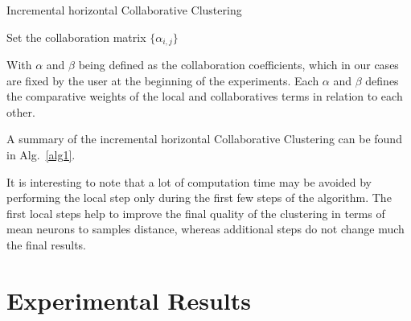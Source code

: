		\begin{algorithm}[H]
			\caption{Incremental horizontal Collaborative Clustering}
\label{alg1}
				Set the collaboration matrix $\{\alpha_{i,j}\}$\\
		\end{algorithm}
		
	With $\alpha$ and $\beta$ being defined as the collaboration coefficients, which in our cases are fixed by the user at the beginning of the experiments. Each $\alpha$ and $\beta$ defines the comparative weights of the local and collaboratives terms in relation to each other.
	
	A summary of the incremental horizontal Collaborative Clustering can be found in Alg.~\ref{alg1}.
	
	It is interesting to note that a lot of computation time may be avoided by performing the local step only during the first few steps of the algorithm. The first local steps help to improve the final quality of the clustering in terms of mean neurons to samples distance, whereas additional steps do not change much the final results.
	
	\section{Experimental Results}
\label{experiments}
	

